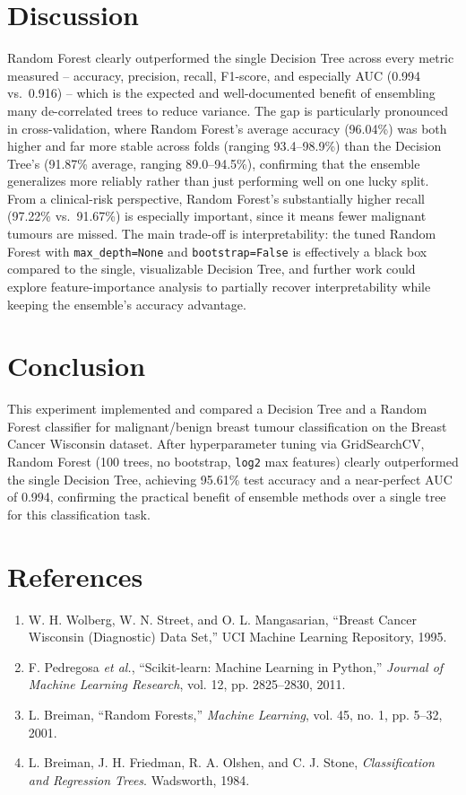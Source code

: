 \documentclass[12pt,a4paper]{article}
\begin{document}
\section{Discussion}

Random Forest clearly outperformed the single Decision Tree across every metric measured -- accuracy, precision, recall, F1-score, and especially AUC (0.994 vs.\ 0.916) -- which is the expected and well-documented benefit of ensembling many de-correlated trees to reduce variance. The gap is particularly pronounced in cross-validation, where Random Forest's average accuracy (96.04\%) was both higher and far more stable across folds (ranging 93.4--98.9\%) than the Decision Tree's (91.87\% average, ranging 89.0--94.5\%), confirming that the ensemble generalizes more reliably rather than just performing well on one lucky split. From a clinical-risk perspective, Random Forest's substantially higher recall (97.22\% vs.\ 91.67\%) is especially important, since it means fewer malignant tumours are missed. The main trade-off is interpretability: the tuned Random Forest with \texttt{max\_depth=None} and \texttt{bootstrap=False} is effectively a black box compared to the single, visualizable Decision Tree, and further work could explore feature-importance analysis to partially recover interpretability while keeping the ensemble's accuracy advantage.

\section{Conclusion}

This experiment implemented and compared a Decision Tree and a Random Forest classifier for malignant/benign breast tumour classification on the Breast Cancer Wisconsin dataset. After hyperparameter tuning via GridSearchCV, Random Forest (100 trees, no bootstrap, \texttt{log2} max features) clearly outperformed the single Decision Tree, achieving 95.61\% test accuracy and a near-perfect AUC of 0.994, confirming the practical benefit of ensemble methods over a single tree for this classification task.

\section{References}
\begin{enumerate}
\item W. H. Wolberg, W. N. Street, and O. L. Mangasarian, ``Breast Cancer Wisconsin (Diagnostic) Data Set,'' UCI Machine Learning Repository, 1995.
\item F. Pedregosa \textit{et al.}, ``Scikit-learn: Machine Learning in Python,'' \textit{Journal of Machine Learning Research}, vol. 12, pp. 2825--2830, 2011.
\item L. Breiman, ``Random Forests,'' \textit{Machine Learning}, vol. 45, no. 1, pp. 5--32, 2001.
\item L. Breiman, J. H. Friedman, R. A. Olshen, and C. J. Stone, \textit{Classification and Regression Trees}. Wadsworth, 1984.
\end{enumerate}
\end{document}
